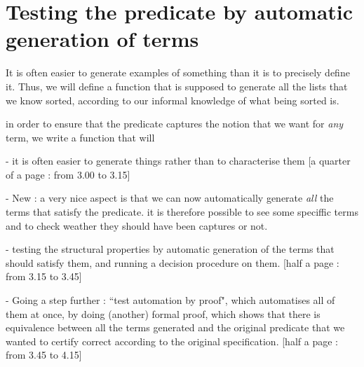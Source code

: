 \section{Testing the predicate by automatic generation of terms}

\label{sect:testingInside}


It is often easier to generate examples of something than it is to precisely define it. Thus, we will define a function that is supposed to generate all the lists that we know sorted, according to our informal knowledge of what being sorted is.
 



in order to ensure that the predicate captures the notion that we want for \emph{any} term, we write a function that will 




- it is often easier to generate things rather than to characterise them 
[a quarter of a page : from 3.00 to 3.15]

- New : a very nice aspect is that we can now automatically generate \emph{all} the terms that satisfy the predicate. it is therefore possible to see some speciffic terms and to check weather they should have been captures or not.

- testing the structural properties by automatic generation of the terms that should satisfy them, and running a decision procedure on them.
[half a page : from 3.15 to 3.45]

- Going a step further : ``test automation by proof", which automatises all of them at once, by doing (another) formal proof, which shows that there is equivalence between all the terms generated and the original predicate that we wanted to certify correct according to the original specification.
[half a page : from 3.45 to 4.15]